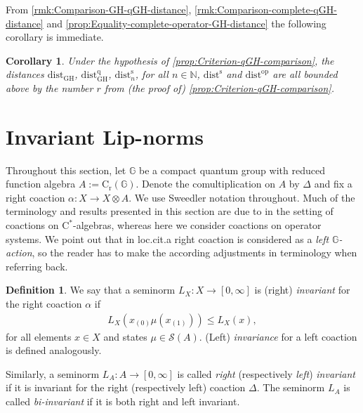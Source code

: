 \documentclass{amsart}
\theoremstyle{plain}
\newtheorem{corollary}[theorem]{Corollary}
\theoremstyle{definition}
\newtheorem{definition}[theorem]{Definition}
\theoremstyle{remark}
\begin{document}
	From \autoref{rmk:Comparison-GH-qGH-distance}, \autoref{rmk:Comparison-complete-qGH-distance} and \autoref{prop:Equality-complete-operator-GH-distance} the following corollary is immediate.
	
	\begin{corollary}\label{cor:Complete-GH-distance-bounds-all-others}
		Under the hypothesis of \autoref{prop:Criterion-qGH-comparison}, the distances $\mathrm{dist}_\mathrm{GH}$, $\mathrm{dist}_\mathrm{GH}^\mathrm{q}$, $\mathrm{dist}_n^\mathrm{s}$, for all $n \in \mathbb{N}$, $\mathrm{dist}^\mathrm{s}$ and $\mathrm{dist}^\mathrm{op}$ are all bounded above by the number $r$ from (the proof of) \autoref{prop:Criterion-qGH-comparison}.
	\end{corollary}
	
	
	
	\section{Invariant Lip-norms}\label{sec:Invariant-Lip-norms}
	
	Throughout this section, let $\mathbb{G}$ be a compact quantum group with reduced function algebra $A := \mathrm{C}_\mathrm{r}(\mathbb{G})$.
	Denote the comultiplication on $A$ by $\Delta$ and fix a right coaction $\alpha : X \rightarrow X \otimes A$.
	We use Sweedler notation throughout.
	Much of the terminology and results presented in this section are due to \cite{Li09} in the setting of coactions on $\mathrm{C}^*$-algebras, whereas here we consider coactions on operator systems.
	We point out that in loc.cit.\@ a right coaction is considered as a \emph{left $\mathbb{G}$-action}, so the reader has to make the according adjustments in terminology when referring back.
	
	\begin{definition}
		We say that a seminorm  $L_X : X \rightarrow [0,\infty]$ is (right) \emph{invariant} for the right coaction $\alpha$ if
		\begin{align}
			L_X(x_{(0)}\mu(x_{(1)})) \leq L_X(x), 
		\end{align}
		for all elements $x \in X$ and states $\mu \in \mathcal{S}(A)$.	
		(Left) \emph{invariance} for a left coaction is defined analogously.
		
		Similarly, a seminorm $L_A : A \rightarrow [0,\infty]$ is called \emph{right} (respectively \emph{left}) \emph{invariant} if it is invariant for the right (respectively left) coaction $\Delta$.
		The seminorm $L_A$ is called \emph{bi-invariant} if it is both right and left invariant.
	\end{definition} 
	
\end{document}

